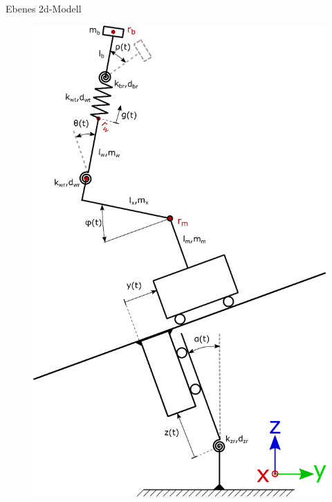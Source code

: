 \documentclass[10pt,xcolor=dvipsnames]{beamer}
\begin{document}
\begin{frame}{Ebenes 2d-Modell}
\begin{minipage}{0.48\textwidth}
\begin{figure}
					\includegraphics[width=0.7\linewidth]{./pics/SchematischesModell.eps}
				\end{figure}
			\end{minipage}
		\end{frame}
\end{document}
